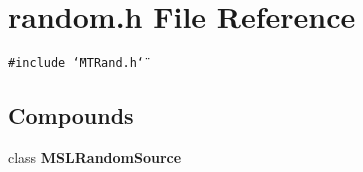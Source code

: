 \section{random.h File Reference}
\label{random_8h}
{\tt \#include \char`\"{}MTRand.h\char`\"{}}\par
\subsection*{Compounds}
\begin{CompactItemize}
\item 
class {\bf MSLRandom\-Source}
\end{CompactItemize}

